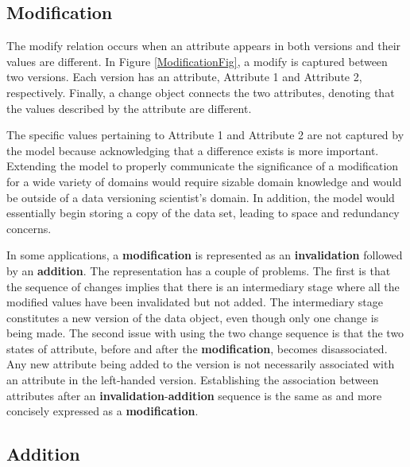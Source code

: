 \subsection{Modification}

The \gls{modify} relation occurs when an \gls{attribute} appears in both \glspl{version} and their values are different.
In Figure \ref{ModificationFig}, a \gls{modify} is captured between two \glspl{version}.
Each \gls{version} has an \gls{attribute}, Attribute 1 and Attribute 2, respectively.
Finally, a \gls{change} object connects the two \glspl{attribute}, denoting that the values described by the \gls{attribute} are different.

The specific values pertaining to Attribute 1 and Attribute 2 are not captured by the model because acknowledging that a difference exists is more important.
Extending the model to properly communicate the significance of a modification for a wide variety of domains would require sizable domain knowledge and would be outside of a data versioning scientist's domain.
In addition, the model would essentially begin storing a copy of the data set, leading to space and redundancy concerns.

In some applications, a \textbf{modification} is represented as an \textbf{invalidation} followed by an \textbf{addition}.
The representation has a couple of problems.
The first is that the sequence of changes implies that there is an intermediary stage where all the modified values have been invalidated but not added.
The intermediary stage constitutes a new version of the data object, even though only one change is being made.
The second issue with using the two change sequence is that the two states of attribute, before and after the \textbf{modification}, becomes disassociated.
Any new attribute being added to the version is not necessarily associated with an attribute in the left-handed version.
Establishing the association between attributes after an \textbf{invalidation}-\textbf{addition} sequence is the same as and more concisely expressed as a \textbf{modification}.

\subsection{Addition}

